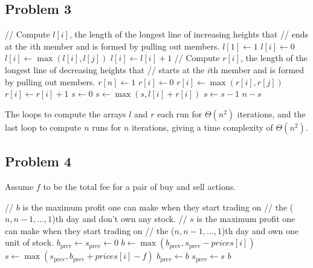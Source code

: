 \documentclass{article}
\begin{document}
\subsection*{Problem 3}

\begin{algorithmic}[1]
    \State // Compute $l[i]$, the length of the longest line of increasing heights that
    \State // ends at the $i$th member and is formed by pulling out members.
    \State $l[1] \gets 1$
        \State $l[i] \gets 0$
                \State $l[i] \gets \max(l[i], l[j])$
            \EndIf
        \EndFor
        \State $l[i] \gets l[i] + 1$
    \EndFor
    \State // Compute $r[i]$, the length of the longest line of decreasing heights that
    \State // starts at the $i$th member and is formed by pulling out members.
    \State $r[n] \gets 1$
        \State $r[i] \gets 0$
                \State $r[i] \gets \max(r[i], r[j])$
            \EndIf
        \EndFor
        \State $r[i] \gets r[i] + 1$
    \EndFor
    \State $s \gets 0$ 
        \State $s \gets \max(s, l[i] + r[i])$
    \EndFor
    \State $s \gets s - 1$
    \State \Return $n - s$
\end{algorithmic}

The loops to compute the arrays $l$ and $r$ each run for $\Theta(n^2)$ iterations, and the last loop to compute $n$ runs for $n$ iterations, giving a time complexity of $\Theta(n^2)$.

\subsection*{Problem 4}

Assume $f$ to be the total fee for a pair of buy and sell actions.

\begin{algorithmic}[1]
    \State // $b$ is the maximum profit one can make when they start trading on
    \State // the ($n, n - 1, \dots, 1$)th day and don't own any stock.
    \State // $s$ is the maximum profit one can make when they start trading on
    \State // the ($n, n - 1, \dots, 1$)th day and own one unit of stock.
    \State $b_\textrm{prev} \gets s_\textrm{prev} \gets 0$
        \State $b \gets \max(b_\textrm{prev}, s_\textrm{prev} - prices[i])$
        \State $s \gets \max(s_\textrm{prev}, b_\textrm{prev} + prices[i] - f)$
        \State $b_\textrm{prev} \gets b$
        \State $s_\textrm{prev} \gets s$
    \EndFor
    \State \Return $b$
\end{algorithmic}
\end{document}
